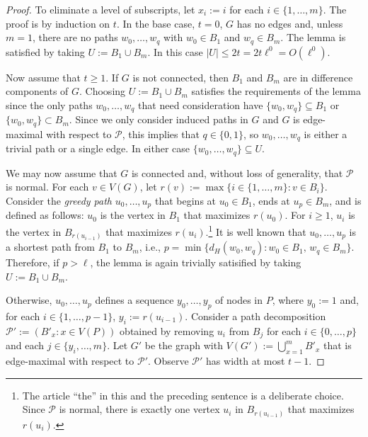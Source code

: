\documentclass[kpfonts]{patmorin}
\theoremstyle{named}
\begin{document}
\begin{proof}
    To eliminate a level of subscripts, let $x_i:=i$ for each $i\in\{1,\ldots,m\}$.  The proof is by induction on $t$. In the base case, $t=0$, $G$ has no edges and, unless $m=1$, there are no paths $w_0,\ldots,w_q$ with $w_0\in B_{1}$ and $w_q\in B_m$. The lemma is satisfied by taking $U:=B_{1}\cup B_{m}$.  In this case $|U|\le 2t= 2t\ell^0=O(\ell^0)$.

    Now assume that $t\ge 1$. If $G$ is not connected, then $B_{1}$ and $B_{m}$ are in difference components of $G$.  Choosing $U:=B_{1}\cup B_{m}$ satisfies the requirements of the lemma since the only paths $w_0,\ldots,w_q$ that need consideration have $\{w_0,w_q\}\subseteq B_1$ or $\{w_0,w_q\}\subset B_m$.  Since we only consider induced paths in $G$ and $G$ is edge-maximal with respect to $\mathcal{P}$, this implies that $q\in\{0,1\}$, so $w_0,\ldots,w_q$ is either a trivial path or a single edge. In either case $\{w_0,\ldots,w_q\}\subseteq U$.

    We may now assume that $G$ is connected and, without loss of generality, that $\mathcal{P}$ is normal. For each $v\in V(G)$, let $r(v):=\max\{i\in\{1,\ldots,m\}:v\in B_i\}$.  Consider the \emph{greedy path} $u_0,\ldots,u_p$ that begins at $u_0\in B_{1}$, ends at $u_p\in B_{m}$, and is defined as follows: $u_0$ is the vertex in $B_{1}$ that maximizes $r(u_0)$.  For $i\ge 1$, $u_i$ is the vertex in $B_{r(u_{i-1})}$ that maximizes $r(u_i)$.\footnote{The article ``the'' in this and the preceding sentence is a deliberate choice. Since $\mathcal{P}$ is normal, there is exactly one vertex $u_i$ in $B_{r(u_{i-1})}$ that maximizes $r(u_i)$.}  It is well known that $u_0,\ldots,u_p$ is a shortest path from $B_{1}$ to $B_{m}$, i.e., $p=\min\{d_H(w_0,w_q): w_0\in B_1,\, w_q\in B_m\}$.  Therefore, if $p>\ell$, the lemma is again trivially satisified by taking $U:=B_{1}\cup B_{m}$.

    Otherwise, $u_0,\ldots,u_p$ defines a sequence $y_0,\ldots,y_p$ of nodes in $P$, where $y_0:=1$ and, for each $i\in\{1,\ldots,p-1\}$, $y_{i}:=r(u_{i-1})$.  Consider a path decomposition $\mathcal{P'}:=(B'_x:x\in V(P))$  obtained by removing $u_i$ from $B_{j}$ for each $i\in\{0,\ldots,p\}$ and each $j\in\{y_i,\ldots,m\}$. Let $G'$ be the graph with $V(G'):=\bigcup_{x=1}^m B'_x$ that is edge-maximal with respect to $\mathcal{P}'$.  Observe $\mathcal{P'}$ has width at most $t-1$.


\end{proof}
\end{document}
